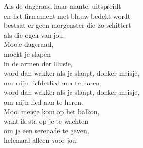 \clearpage

\begin{translation}
Als de dageraad haar mantel uitspreidt\\
en het firmament met blauw bedekt wordt\\
bestaat er geen morgenster die zo schittert\\
als die ogen van jou.\\\vspace{1em}
Mooie dageraad,\\
mocht je slapen\\
in de armen der illusie,\\
word dan wakker als je slaapt, donker meisje,\\
om mijn liefdeslied aan te horen,\\
word dan wakker als je slaapt, donker meisje,\\
om mijn lied aan te horen.\\\vspace{1em}
Mooi meisje kom op het balkon,\\
want ik sta op je te wachten\\
om je een serenade te geven,\\
helemaal alleen voor jou.\\
\end{translation}
